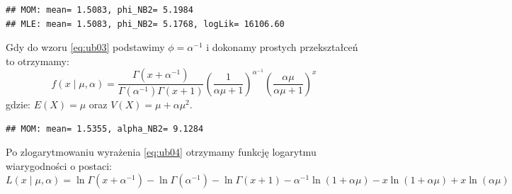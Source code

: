 \documentclass[polish,]{book}
\newenvironment{Shaded}{\begin{snugshade}}{\end{snugshade}}
\newcommand{\BuiltInTok}[1]{#1}
\newcommand{\CommentTok}[1]{\textcolor[rgb]{0.56,0.35,0.01}{\textit{#1}}}
\newcommand{\ControlFlowTok}[1]{\textcolor[rgb]{0.13,0.29,0.53}{\textbf{#1}}}
\newcommand{\DecValTok}[1]{\textcolor[rgb]{0.00,0.00,0.81}{#1}}
\newcommand{\FloatTok}[1]{\textcolor[rgb]{0.00,0.00,0.81}{#1}}
\newcommand{\ImportTok}[1]{#1}
\newcommand{\KeywordTok}[1]{\textcolor[rgb]{0.13,0.29,0.53}{\textbf{#1}}}
\newcommand{\NormalTok}[1]{#1}
\newcommand{\OperatorTok}[1]{\textcolor[rgb]{0.81,0.36,0.00}{\textbf{#1}}}
\newcommand{\SpecialCharTok}[1]{\textcolor[rgb]{0.00,0.00,0.00}{#1}}
\newcommand{\StringTok}[1]{\textcolor[rgb]{0.31,0.60,0.02}{#1}}
\begin{document}
\begin{verbatim}
## MOM: mean= 1.5083, phi_NB2= 5.1984
## MLE: mean= 1.5083, phi_NB2= 5.1768, logLik= 16106.60
\end{verbatim}

Gdy do wzoru \eqref{eq:ub03} podstawimy \(\phi=\alpha^{-1}\) i dokonamy prostych przekształceń to otrzymamy:
\begin{equation}
f(x\;|\;\mu,\alpha)=\frac{\Gamma(x+\alpha^{-1})}{\Gamma(\alpha^{-1})\Gamma(x+1)}\left(\frac{1}{\alpha\mu+1}\right)^{\alpha^{-1}}\left(\frac{\alpha\mu}{\alpha\mu+1}\right)^x
\label{eq:ub04}
\end{equation}
gdzie: \(E(X)=\mu\) oraz \(V(X)=\mu+\alpha\mu^2\).

\begin{Shaded}
\end{Shaded}

\begin{verbatim}
## MOM: mean= 1.5355, alpha_NB2= 9.1284
\end{verbatim}

Po zlogarytmowaniu wyrażenia \eqref{eq:ub04} otrzymamy funkcję logarytmu wiarygodności o postaci:
\begin{equation}
L(x\;|\;\mu,\alpha)=\ln\Gamma(x+\alpha^{-1})-\ln\Gamma(\alpha^{-1})-\ln\Gamma(x+1)-\alpha^{-1}\ln(1+\alpha\mu)-x\ln(1+\alpha\mu)+x\ln(\alpha\mu)
\label{eq:ub05}
\end{equation}
\end{document}
